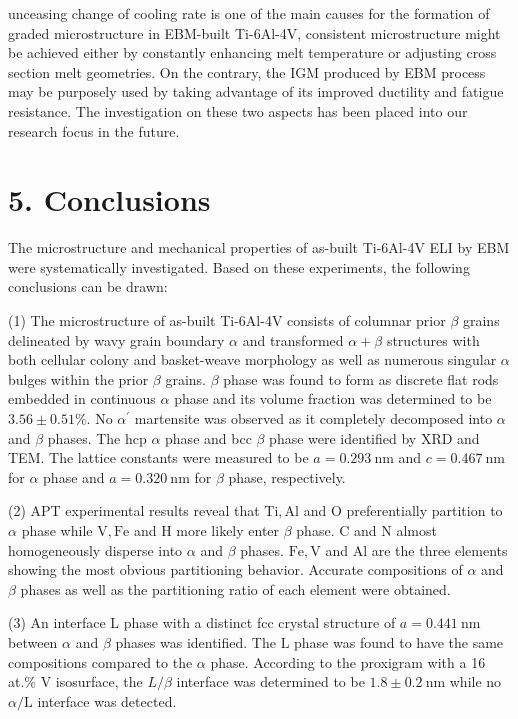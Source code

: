 \documentclass[10pt]{article}
\begin{document}
unceasing change of cooling rate is one of the main causes for the formation of graded microstructure in EBM-built Ti-6Al-4V, consistent microstructure might be achieved either by constantly enhancing melt temperature or adjusting cross section melt geometries. On the contrary, the IGM produced by EBM process may be purposely used by taking advantage of its improved ductility and fatigue resistance. The investigation on these two aspects has been placed into our research focus in the future.

\section*{5. Conclusions}
The microstructure and mechanical properties of as-built Ti-6Al-4V ELI by EBM were systematically investigated. Based on these experiments, the following conclusions can be drawn:

(1) The microstructure of as-built Ti-6Al-4V consists of columnar prior $\beta$ grains delineated by wavy grain boundary $\alpha$ and transformed $\alpha+\beta$ structures with both cellular colony and basket-weave morphology as well as numerous singular $\alpha$ bulges within the prior $\beta$ grains. $\beta$ phase was found to form as discrete flat rods embedded in continuous $\alpha$ phase and its volume fraction was determined to be $3.56 \pm 0.51 \%$. No $\alpha^{\prime}$ martensite was observed as it completely decomposed into $\alpha$ and $\beta$ phases. The hcp $\alpha$ phase and bcc $\beta$ phase were identified by XRD and TEM. The lattice constants were measured to be $a=0.293 \mathrm{~nm}$ and $c=0.467 \mathrm{~nm}$ for $\alpha$ phase and $a=0.320 \mathrm{~nm}$ for $\beta$ phase, respectively.

(2) APT experimental results reveal that $\mathrm{Ti}, \mathrm{Al}$ and $\mathrm{O}$ preferentially partition to $\alpha$ phase while $\mathrm{V}, \mathrm{Fe}$ and $\mathrm{H}$ more likely enter $\beta$ phase. $\mathrm{C}$ and $\mathrm{N}$ almost homogeneously disperse into $\alpha$ and $\beta$ phases. $\mathrm{Fe}, \mathrm{V}$ and $\mathrm{Al}$ are the three elements showing the most obvious partitioning behavior. Accurate compositions of $\alpha$ and $\beta$ phases as well as the partitioning ratio of each element were obtained.

(3) An interface L phase with a distinct fcc crystal structure of $a=0.441 \mathrm{~nm}$ between $\alpha$ and $\beta$ phases was identified. The $\mathrm{L}$ phase was found to have the same compositions compared to the $\alpha$ phase. According to the proxigram with a 16 at.\% $\mathrm{V}$ isosurface, the $L / \beta$ interface was determined to be $1.8 \pm 0.2 \mathrm{~nm}$ while no $\alpha / \mathrm{L}$ interface was detected.
\end{document}
